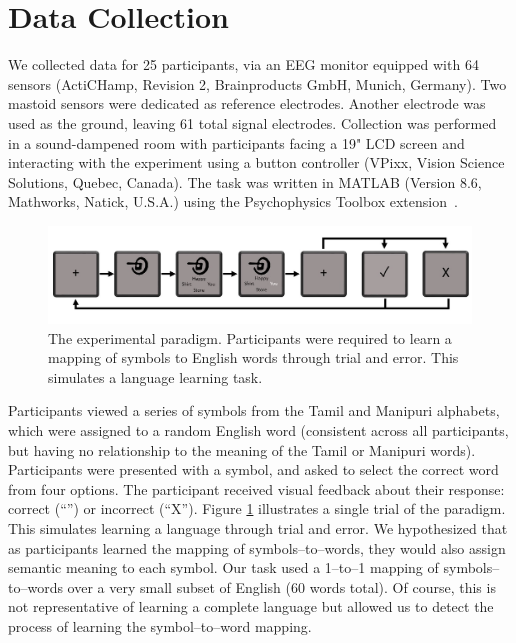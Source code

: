\section{Data Collection}
  We collected data for 25 participants, via an EEG monitor equipped with 64 sensors (ActiCHamp, Revision 2, Brainproducts GmbH, Munich, Germany). Two mastoid sensors were dedicated as reference electrodes. Another electrode was used as the ground, leaving 61 total signal electrodes. Collection was performed in a sound-dampened room with participants facing a 19" LCD screen and interacting with the experiment using a button controller (VPixx, Vision Science Solutions, Quebec, Canada). The task was written in MATLAB (Version 8.6, Mathworks, Natick, U.S.A.) using the Psychophysics Toolbox extension~\cite{brainard1997psychophysics}.

  \begin{figure}[t]
    \centering
    \includegraphics[width=\linewidth]{figures/experiment}
    \caption{The experimental paradigm. Participants were required to learn a mapping of symbols to English words through trial and error. This simulates a language learning task.}
    \label{fig:experiment}
  \end{figure}

  Participants viewed a series of symbols from the Tamil and Manipuri alphabets, which were assigned to a random English word (consistent across all participants, but having no relationship to the meaning of the Tamil or Manipuri words).  Participants were presented with a symbol, and asked to select the correct word from four options. The participant received visual feedback about their response: correct (``\CheckmarkBold'') or incorrect (``X''). Figure \ref{fig:experiment} illustrates a single trial of the paradigm. This simulates learning a language through trial and error. We hypothesized that as participants learned the mapping of symbols--to--words, they would also assign semantic meaning to each symbol. Our task used a 1--to--1 mapping of symbols--to--words over a very small subset of English (60 words total). Of course, this is not representative of learning a complete language but allowed us to detect the process of learning the symbol--to--word mapping.
  
